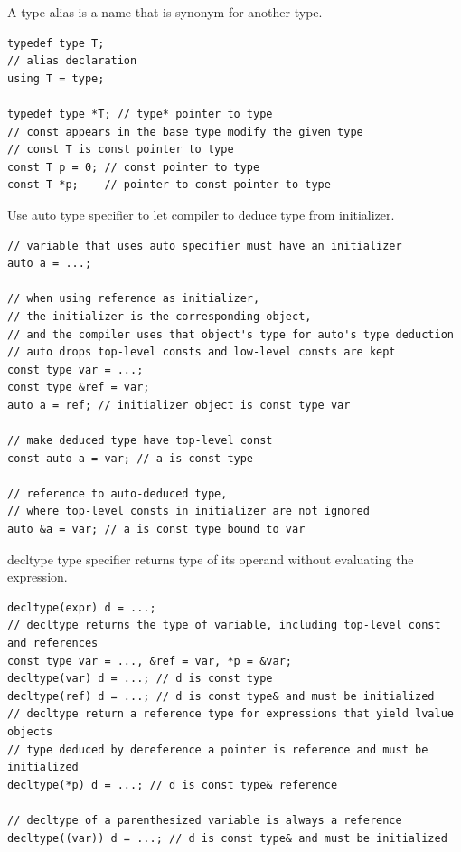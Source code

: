 \documentclass{blog}
\begin{document}
\begin{definition}[typedef]
    A type alias is a name that is synonym for another type.
    \begin{verbatim}
typedef type T;
// alias declaration
using T = type;

typedef type *T; // type* pointer to type
// const appears in the base type modify the given type
// const T is const pointer to type
const T p = 0; // const pointer to type
const T *p;    // pointer to const pointer to type
\end{verbatim}
\end{definition}

\begin{definition}[auto]
    Use auto type specifier to let compiler to deduce type from initializer.
    \begin{verbatim}
// variable that uses auto specifier must have an initializer
auto a = ...;

// when using reference as initializer,
// the initializer is the corresponding object,
// and the compiler uses that object's type for auto's type deduction
// auto drops top-level consts and low-level consts are kept
const type var = ...;
const type &ref = var;
auto a = ref; // initializer object is const type var

// make deduced type have top-level const
const auto a = var; // a is const type

// reference to auto-deduced type,
// where top-level consts in initializer are not ignored
auto &a = var; // a is const type bound to var
\end{verbatim}
\end{definition}

\begin{definition}[decltype]
    decltype type specifier returns type of its operand without evaluating the expression.
    \begin{verbatim}
decltype(expr) d = ...;
// decltype returns the type of variable, including top-level const and references
const type var = ..., &ref = var, *p = &var;
decltype(var) d = ...; // d is const type
decltype(ref) d = ...; // d is const type& and must be initialized
// decltype return a reference type for expressions that yield lvalue objects
// type deduced by dereference a pointer is reference and must be initialized
decltype(*p) d = ...; // d is const type& reference

// decltype of a parenthesized variable is always a reference
decltype((var)) d = ...; // d is const type& and must be initialized
\end{verbatim}
\end{definition}
\end{document}
